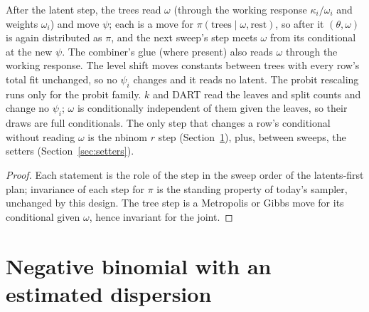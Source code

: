 \begin{proposition}\label{prop:steps}
After the latent step, the trees read $\omega$ (through the working response $\kappa_i/\omega_i$ and weights
$\omega_i$) and move $\psi$; each is a move for $\pi(\text{trees}\mid\omega,\text{rest})$, so after it
$(\theta,\omega)$ is again distributed as $\pi$, and the next sweep's step meets $\omega$ from its conditional at
the new $\psi$. The combiner's glue (where present) also reads $\omega$ through the working response. The level
shift moves constants between trees with every row's total fit unchanged, so no $\psi_i$ changes and it reads no
latent. The probit rescaling runs only for the probit family. $k$ and DART read the leaves and split counts and
change no $\psi_i$; $\omega$ is conditionally independent of them given the leaves, so their draws are full
conditionals. The only step that changes a row's conditional without reading $\omega$ is the nbinom $r$ step
(Section~\ref{sec:nb}), plus, between sweeps, the setters (Section~\ref{sec:setters}).
\end{proposition}
\begin{proof}
Each statement is the role of the step in the sweep order of the latents-first plan; invariance of each step for
$\pi$ is the standing property of today's sampler, unchanged by this design. The tree step is a Metropolis or Gibbs
move for its conditional given $\omega$, hence invariant for the joint.
\end{proof}

\section{Negative binomial with an estimated dispersion}\label{sec:nb}

